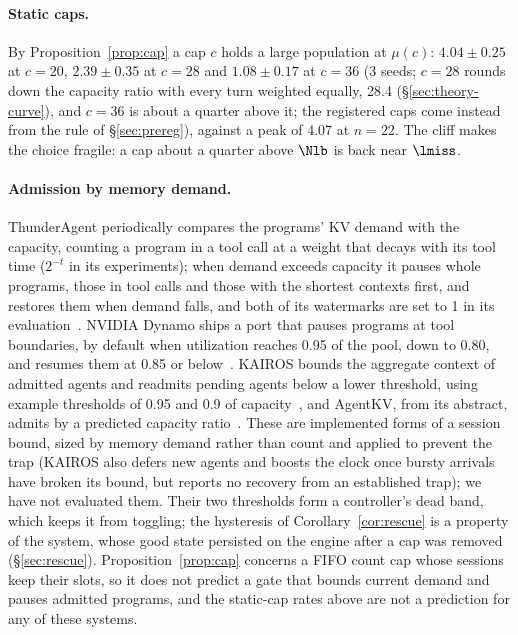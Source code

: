 \paragraph{Static caps.} By Proposition~\ref{prop:cap} a cap $c$ holds a large population at $\mu(c)$: $4.04\pm0.25$ at $c=20$, $2.39\pm0.35$ at $c=28$ and $1.08\pm0.17$ at $c=36$ (3 seeds; $c=28$ rounds down the capacity ratio with every turn weighted equally, 28.4 (\S\ref{sec:theory-curve}), and $c=36$ is about a quarter above it; the registered caps come instead from the rule of \S\ref{sec:prereg}), against a peak of 4.07 at $n=22$. The cliff makes the choice fragile: a cap about a quarter above $\Nlb$ is back near $\lmiss$.

\paragraph{Admission by memory demand.} ThunderAgent periodically compares the programs' KV demand with the capacity, counting a program in a tool call at a weight that decays with its tool time ($2^{-t}$ in its experiments); when demand exceeds capacity it pauses whole programs, those in tool calls and those with the shortest contexts first, and restores them when demand falls, and both of its watermarks are set to 1 in its evaluation~\citep{kang2026thunderagent}. NVIDIA Dynamo ships a port that pauses programs at tool boundaries, by default when utilization reaches 0.95 of the pool, down to 0.80, and resumes them at 0.85 or below~\citep{dhanani2026dynamo}. KAIROS bounds the aggregate context of admitted agents and readmits pending agents below a lower threshold, using example thresholds of 0.95 and 0.9 of capacity~\citep{yuan2026kairos}, and AgentKV, from its abstract, admits by a predicted capacity ratio~\citep{anon2026agentkv}. These are implemented forms of a session bound, sized by memory demand rather than count and applied to prevent the trap (KAIROS also defers new agents and boosts the clock once bursty arrivals have broken its bound, but reports no recovery from an established trap); we have not evaluated them. Their two thresholds form a controller's dead band, which keeps it from toggling; the hysteresis of Corollary~\ref{cor:rescue} is a property of the system, whose good state persisted on the engine after a cap was removed (\S\ref{sec:rescue}). Proposition~\ref{prop:cap} concerns a FIFO count cap whose sessions keep their slots, so it does not predict a gate that bounds current demand and pauses admitted programs, and the static-cap rates above are not a prediction for any of these systems.

